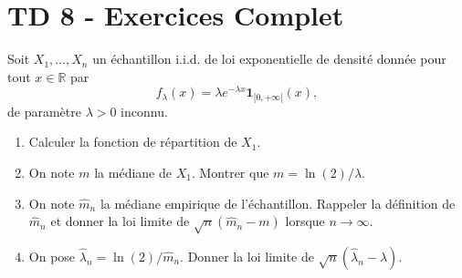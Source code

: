 \chapter*{TD 8 - Exercices Complet}

\setcounter{exercice}{0}

\begin{mdframed}
\begin{exercice}
Soit $X_1, \dots, X_n$ un échantillon i.i.d. de loi exponentielle de densité donnée pour tout $x \in \mathbb{R}$ par
\begin{equation*}
f_\lambda(x) = \lambda e^{-\lambda x} \mathbf{1}_{[0, +\infty[}(x),
\end{equation*}
de paramètre $\lambda > 0$ inconnu.

\begin{enumerate}
    \item Calculer la fonction de répartition de $X_1$.
    \item On note $m$ la médiane de $X_1$. Montrer que $m = \ln(2)/\lambda$.
    \item On note $\hat{m}_n$ la médiane empirique de l'échantillon. Rappeler la définition de $\hat{m}_n$ et donner la loi limite de $\sqrt{n}(\hat{m}_n - m)$ lorsque $n \to \infty$.
    \item On pose $\hat{\lambda}_n = \ln(2)/\hat{m}_n$. Donner la loi limite de $\sqrt{n}(\hat{\lambda}_n - \lambda)$.
\end{enumerate}
\end{exercice}
\end{mdframed}

\smallskip

